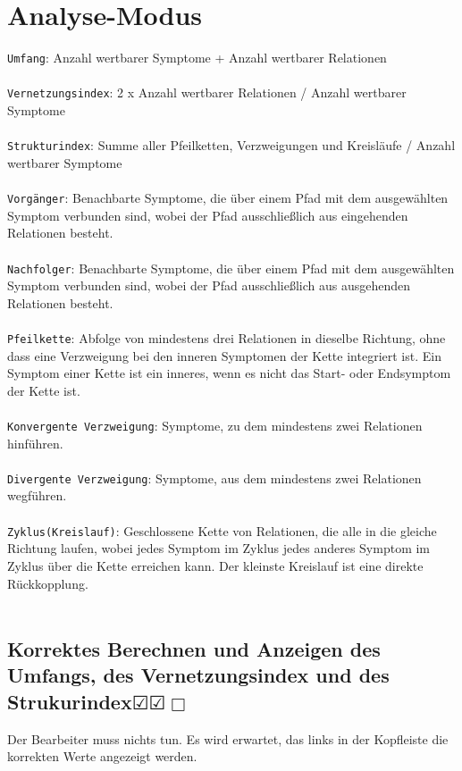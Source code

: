 \documentclass[enabledeprecatedfontcommands]{scrartcl}
\newcommand{\subsectiont}[2]{\subsection[#1]{#1{\normalsize\normalfont #2}}}
\newcommand{\leer}{$\Box$}
\newcommand{\ok}{$\CheckedBox$}
\begin{document}
\section{Analyse-Modus}

\texttt{Umfang}: Anzahl wertbarer Symptome + Anzahl wertbarer Relationen\\\\
\texttt{Vernetzungsindex}: 2 x Anzahl wertbarer Relationen / Anzahl wertbarer Symptome\\\\
\texttt{Strukturindex}: Summe aller Pfeilketten, Verzweigungen und Kreisläufe / Anzahl wertbarer Symptome\\\\
\texttt{Vorgänger}: Benachbarte Symptome, die über einem Pfad mit dem ausgewählten Symptom verbunden sind, 
wobei der Pfad ausschließlich aus eingehenden Relationen besteht.\\\\
\texttt{Nachfolger}: Benachbarte Symptome, die über einem Pfad mit dem ausgewählten Symptom verbunden sind,
wobei der Pfad ausschließlich aus ausgehenden Relationen besteht.\\\\
\texttt{Pfeilkette}: Abfolge von mindestens drei Relationen in dieselbe Richtung, ohne dass eine Verzweigung bei den inneren Symptomen der Kette integriert ist. Ein Symptom einer Kette ist ein inneres, wenn es nicht das Start- oder Endsymptom der Kette ist.\\\\
\texttt{Konvergente Verzweigung}: Symptome, zu dem mindestens zwei Relationen hinführen.\\\\
\texttt{Divergente Verzweigung}: Symptome, aus dem mindestens zwei Relationen wegführen.\\\\
\texttt{Zyklus(Kreislauf)}: Geschlossene Kette von Relationen, die alle in die gleiche Richtung laufen, wobei jedes Symptom im Zyklus jedes anderes Symptom im Zyklus über die Kette erreichen kann. Der kleinste Kreislauf ist eine direkte Rückkopplung.\\\\

\subsectiont{Korrektes Berechnen und Anzeigen des Umfangs, des Vernetzungsindex und des Strukurindex}{\dotfill\ok\ok\leer}
Der Bearbeiter muss nichts tun. Es wird erwartet, das links in der Kopfleiste die korrekten Werte angezeigt werden. 
\end{document}
